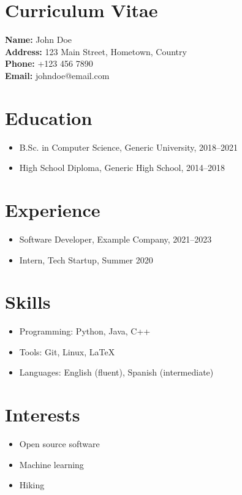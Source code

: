 \documentclass{article}
\begin{document}
\section*{Curriculum Vitae}

\textbf{Name:} John Doe \\
\textbf{Address:} 123 Main Street, Hometown, Country \\
\textbf{Phone:} +123 456 7890 \\
\textbf{Email:} johndoe@email.com

\section*{Education}
\begin{itemize}
    \item B.Sc. in Computer Science, Generic University, 2018--2021
    \item High School Diploma, Generic High School, 2014--2018
\end{itemize}

\section*{Experience}
\begin{itemize}
    \item Software Developer, Example Company, 2021--2023
    \item Intern, Tech Startup, Summer 2020
\end{itemize}

\section*{Skills}
\begin{itemize}
    \item Programming: Python, Java, C++
    \item Tools: Git, Linux, LaTeX
    \item Languages: English (fluent), Spanish (intermediate)
\end{itemize}

\section*{Interests}
\begin{itemize}
    \item Open source software
    \item Machine learning
    \item Hiking
\end{itemize}
\end{document}
